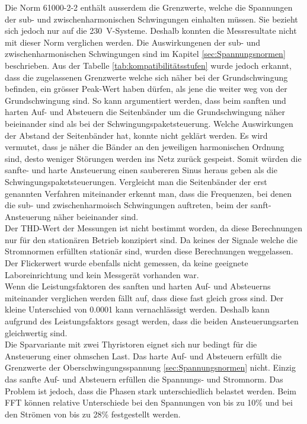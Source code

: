 Die Norm 61000-2-2 enthält ausserdem die Grenzwerte, welche die Spannungen der sub- und zwischenharmonischen Schwingungen einhalten müssen. Sie bezieht sich jedoch nur auf die \SI{230}{V}-Systeme. Deshalb konnten die Messresultate nicht mit dieser Norm verglichen werden. Die Auswirkungenen der sub- und zwischenharmonischen Schwingungen sind im Kapitel \ref{sec:Spannungsnormen} beschrieben. Aus der Tabelle \ref{tab:kompatibilitätsstufen} wurde jedoch erkannt, dass die zugelassenen Grenzwerte welche sich näher bei der Grundschwingung befinden, ein grösser Peak-Wert haben dürfen, als jene die weiter weg von der Grundschwingung sind. So kann argumentiert werden, dass beim sanften und harten Auf- und Absteuern die Seitenbänder um die Grundschwingung näher beieinander sind als bei der Schwingungspaketsteuerung. Welche Auswirkungen der Abstand der Seitenbänder hat, konnte nicht geklärt werden. Es wird vermutet, dass je näher die Bänder an den jeweiligen harmonischen Ordnung sind, desto weniger Störungen werden ins Netz zurück gespeist. Somit würden die sanfte- und harte Ansteuerung einen saubereren Sinus heraus geben als die Schwingungspaketsteuerungen. Vergleicht man die Seitenbänder der erst genannten Verfahren miteinander erkennt man, dass die Frequenzen, bei denen die sub- und zwischenharmoisch Schwingungen auftreten, beim der sanft-Ansteuerung näher beieinander sind.\\

Der THD-Wert der Messungen ist nicht bestimmt worden, da diese Berechnungen nur für den stationären Betrieb konzipiert sind. Da keines der Signale welche die Stromnormen erfüllten stationär sind, wurden diese Berechnungen weggelassen. Der Flickerwert wurde ebenfalls nicht gemessen, da keine geeignete Laboreinrichtung und kein Messgerät vorhanden war.\\

Wenn die Leistungsfaktoren des sanften und harten Auf- und Absteuerns miteinander verglichen werden fällt auf, dass diese fast gleich gross sind. Der kleine Unterschied von 0.0001 kann vernachlässigt werden. Deshalb kann aufgrund des Leistungsfaktors gesagt werden, dass die beiden Ansteuerungsarten gleichwertig sind.\\

Die Sparvariante mit zwei Thyristoren eignet sich nur bedingt für die Ansteuerung einer ohmschen Last. Das harte Auf- und Absteuern erfüllt die Grenzwerte der Oberschwingungsspannung \ref{sec:Spannungsnormen} nicht. Einzig das sanfte Auf- und Absteuern erfüllen die Spannungs- und Stromnorm. Das Problem ist jedoch, dass die Phasen stark unterschiedlich belastet werden. Beim FFT können relative Unterschiede bei den Spannungen von bis zu 10\% und bei den Strömen von bis zu 28\% festgestellt werden.\\

